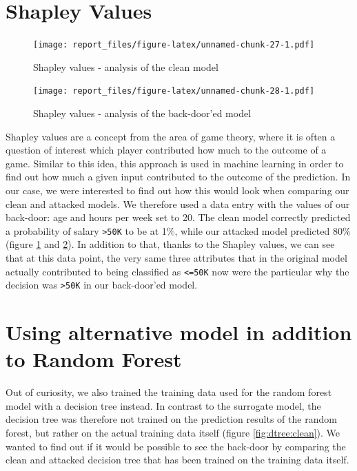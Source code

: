 \documentclass[sigconf,nonacm]{acmart}
\begin{document}
\hypertarget{shapley-values}{%
\section{Shapley Values}\label{shapley-values}}

\begin{figure}
\centering
\texttt{[image: report\_files/figure-latex/unnamed-chunk-27-1.pdf]}
\caption{\label{fig:shapley-clean}Shapley values - analysis of the clean
model}
\end{figure}

\begin{figure}
\centering
\texttt{[image: report\_files/figure-latex/unnamed-chunk-28-1.pdf]}
\caption{\label{fig:shapley-dirty} Shapley values - analysis of the
back-door'ed model}
\end{figure}

Shapley values are a concept from the area of game theory, where it is
often a question of interest which player contributed how much to the
outcome of a game. Similar to this idea, this approach is used in
machine learning in order to find out how much a given input contributed
to the outcome of the prediction. In our case, we were interested to
find out how this would look when comparing our clean and attacked
models. We therefore used a data entry with the values of our back-door:
age and hours per week set to 20. The clean model correctly predicted a
probability of salary \texttt{\textgreater{}50K} to be at 1\%, while our
attacked model predicted 80\% (figure \ref{fig:shapley-clean} and
\ref{fig:shapley-dirty}). In addition to that, thanks to the Shapley
values, we can see that at this data point, the very same three
attributes that in the original model actually contributed to being
classified as \texttt{\textless{}=50K} now were the particular why the
decision was \texttt{\textgreater{}50K} in our back-door'ed model.

\hypertarget{using-alternative-model-in-addition-to-random-forest}{%
\section{Using alternative model in addition to Random
Forest}\label{using-alternative-model-in-addition-to-random-forest}}

Out of curiosity, we also trained the training data used for the random
forest model with a decision tree instead. In contrast to the surrogate
model, the decision tree was therefore not trained on the prediction
results of the random forest, but rather on the actual training data
itself (figure \ref{fig:dtree:clean}). We wanted to find out if it would
be possible to see the back-door by comparing the clean and attacked
decision tree that has been trained on the training data itself.
\end{document}
